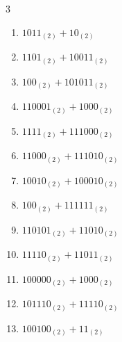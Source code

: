 \begin{multicols}{3}
\begin{enumerate}
\columnbreak %

\resetques

  \item $1011_{(2)} + 10_{(2)}$


  \item $1101_{(2)} + 10011_{(2)}$


  \item $100_{(2)} + 101011_{(2)}$


  \item $110001_{(2)} + 1000_{(2)}$


  \item $1111_{(2)} + 111000_{(2)}$


  \item $11000_{(2)} + 111010_{(2)}$


  \item $10010_{(2)} + 100010_{(2)}$


  \item $100_{(2)} + 111111_{(2)}$


  \item $110101_{(2)} + 11010_{(2)}$


  \item $11110_{(2)} + 11011_{(2)}$


\columnbreak %

  \item $100000_{(2)} + 1000_{(2)}$


  \item $101110_{(2)} + 11110_{(2)}$


  \item $100100_{(2)} + 11_{(2)}$



\end{enumerate}
\end{multicols}

